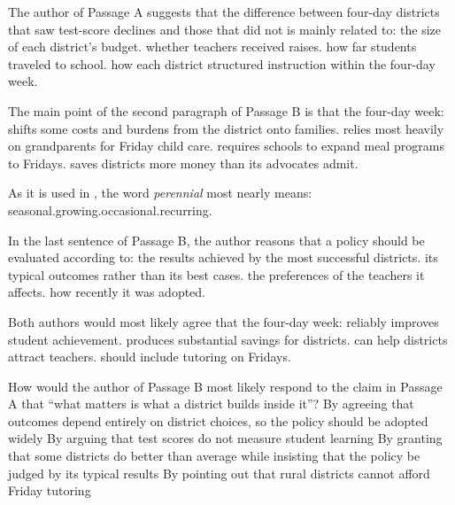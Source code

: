 \documentclass[11pt]{article}
\begin{document}
{The author of Passage A suggests that the difference between four-day districts that saw test-score declines and those that did not is mainly related to:}
{the size of each district's budget.}
{whether teachers received raises.}
{how far students traveled to school.}
{how each district structured instruction within the four-day week.}

{The main point of the second paragraph of Passage B is that the four-day week:}
{shifts some costs and burdens from the district onto families.}
{relies most heavily on grandparents for Friday child care.}
{requires schools to expand meal programs to Fridays.}
{saves districts more money than its advocates admit.}

{As it is used in , the word \emph{perennial} most nearly means:}
{seasonal.}{growing.}{occasional.}{recurring.}

{In the last sentence of Passage B, the author reasons that a policy should be evaluated according to:}
{the results achieved by the most successful districts.}
{its typical outcomes rather than its best cases.}
{the preferences of the teachers it affects.}
{how recently it was adopted.}

{Both authors would most likely agree that the four-day week:}
{reliably improves student achievement.}
{produces substantial savings for districts.}
{can help districts attract teachers.}
{should include tutoring on Fridays.}

{How would the author of Passage B most likely respond to the claim in Passage A that ``what matters is what a district builds inside it''?}
{By agreeing that outcomes depend entirely on district choices, so the policy should be adopted widely}
{By arguing that test scores do not measure student learning}
{By granting that some districts do better than average while insisting that the policy be judged by its typical results}
{By pointing out that rural districts cannot afford Friday tutoring}
\end{document}
